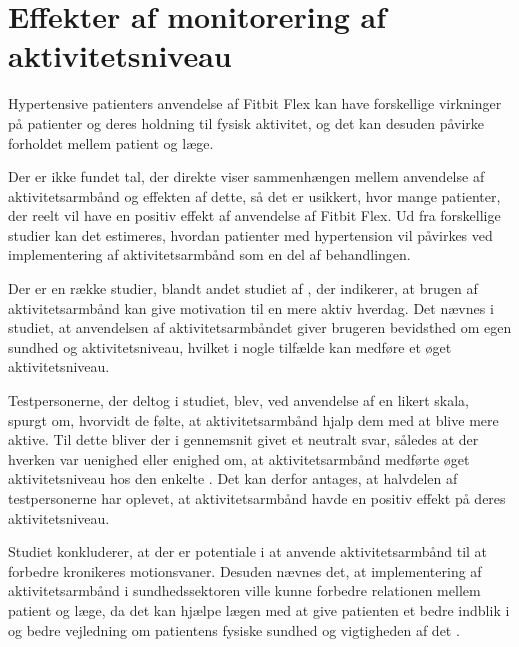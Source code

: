 \section{Effekter af monitorering af aktivitetsniveau}

Hypertensive patienters anvendelse af Fitbit Flex kan have forskellige virkninger på patienter og deres holdning til fysisk aktivitet, og det kan desuden påvirke forholdet mellem patient og læge.

Der er ikke fundet tal, der direkte viser sammenhængen mellem anvendelse af aktivitetsarmbånd og effekten af dette, så det er usikkert, hvor mange patienter, der reelt vil have en positiv effekt af anvendelse af Fitbit Flex. Ud fra forskellige studier kan det estimeres, hvordan patienter med hypertension vil påvirkes ved implementering af aktivitetsarmbånd som en del af behandlingen.

Der er en række studier, blandt andet studiet af \citeauthor{mercer2016}, der indikerer, at brugen af aktivitetsarmbånd kan give motivation til en mere aktiv hverdag. Det nævnes i studiet, at anvendelsen af aktivitetsarmbåndet giver brugeren bevidsthed om egen sundhed og aktivitetsniveau, hvilket i nogle tilfælde kan medføre et øget aktivitetsniveau. 

Testpersonerne, der deltog i studiet, blev, ved anvendelse af en likert skala, spurgt om, hvorvidt de følte, at aktivitetsarmbånd hjalp dem med at blive mere aktive. Til dette bliver der i gennemsnit givet et neutralt svar, således at der hverken var uenighed eller enighed om, at aktivitetsarmbånd medførte øget aktivitetsniveau hos den enkelte \citep{mercer2016}. Det kan derfor antages, at halvdelen af testpersonerne har oplevet, at aktivitetsarmbånd havde en positiv effekt på deres aktivitetsniveau.

Studiet konkluderer, at der er potentiale i at anvende aktivitetsarmbånd til at forbedre kronikeres motionsvaner. Desuden nævnes det, at implementering af aktivitetsarmbånd i sundhedssektoren ville kunne forbedre relationen mellem patient og læge, da det kan hjælpe lægen med at give patienten et bedre indblik i og bedre vejledning om patientens fysiske sundhed og vigtigheden af det \citep{mercer2016}. 

